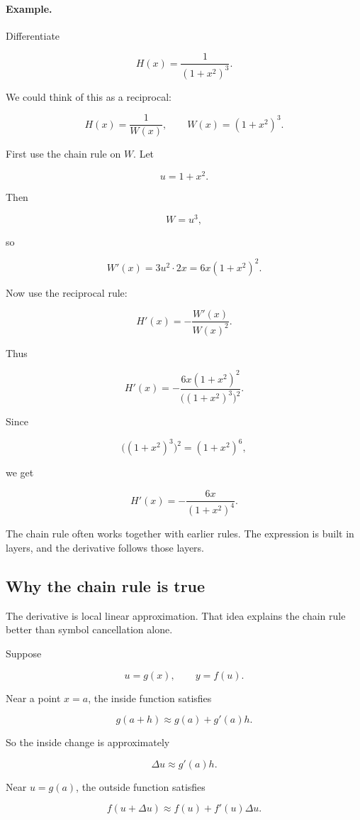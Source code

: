 \paragraph{Example.}
Differentiate

\[
H(x)=\frac{1}{(1+x^2)^3}.
\]

We could think of this as a reciprocal:

\[
H(x)=\frac1{W(x)},
\qquad
W(x)=(1+x^2)^3.
\]

First use the chain rule on \(W\).  Let

\[
u=1+x^2.
\]

Then

\[
W=u^3,
\]

so

\[
W'(x)=3u^2\cdot 2x=6x(1+x^2)^2.
\]

Now use the reciprocal rule:

\[
H'(x)
=
-\frac{W'(x)}{W(x)^2}.
\]

Thus

\[
H'(x)
=
-\frac{6x(1+x^2)^2}{\bigl((1+x^2)^3\bigr)^2}.
\]

Since

\[
\bigl((1+x^2)^3\bigr)^2=(1+x^2)^6,
\]

we get

\[
\boxed{
H'(x)
=
-\frac{6x}{(1+x^2)^4}.
}
\]

The chain rule often works together with earlier rules.  The expression is built in layers, and the derivative follows those layers.

\subsection{Why the chain rule is true}
\label{subsec:why-chain-rule-true}

The derivative is local linear approximation.  That idea explains the chain rule better than symbol cancellation alone.

Suppose

\[
u=g(x),
\qquad
y=f(u).
\]

Near a point \(x=a\), the inside function satisfies

\[
g(a+h)\approx g(a)+g'(a)h.
\]

So the inside change is approximately

\[
\Delta u \approx g'(a)h.
\]

Near \(u=g(a)\), the outside function satisfies

\[
f(u+\Delta u)\approx f(u)+f'(u)\Delta u.
\]


